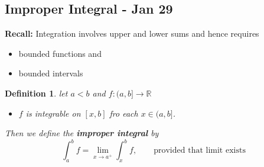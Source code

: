\documentclass[12pt]{article}
\theoremstyle{plain}
\newtheorem{definition}{Definition}[subsection]
\newcommand{\mR}{{\mathbb{R}}}
\begin{document}
\newpage
\subsection{Improper Integral - Jan 29}
\textbf{Recall: }Integration involves upper and lower sums and hence
requires 
\begin{itemize}
	\item bounded functions and 
	\item bounded intervals
\end{itemize}

\begin{definition}
	let $a<b$ and $f:(a,b]\to \mR$
	\begin{itemize}
		\item $f$ is integrable on $[x,b]$ fro each $x\in (a,b]$. 
	\end{itemize}
	Then we define the \textbf{improper integral} by 
	\[
		\int_a^b f = \lim_{x\to a^+} \int_x^b f, \qquad \text{provided that
		limit exists}
	\]
\end{definition}
\end{document}
